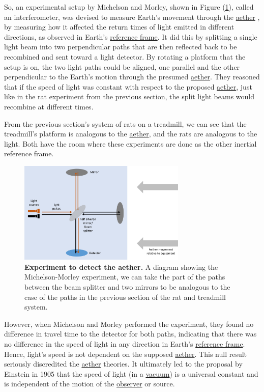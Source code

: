 So, an experimental setup by Michelson and Morley, shown in Figure (\ref{fig: Michelson_morley}), called an interferometer, was devised to measure Earth's movement through the \hyperlink{def-aether}{aether} \cite{EtherExperiment}, by measuring how it affected the return times of light emitted in different directions, as observed in Earth's \hyperlink{def-Reference-frame}{reference frame}.
It did this by splitting a single light beam into two perpendicular paths that are then reflected back to be recombined and sent toward a light detector.
By rotating a platform that the setup is on, the two light paths could be aligned, one parallel and the other perpendicular to the Earth's motion through the presumed \hyperlink{def-aether}{aether}.
They reasoned that if the speed of light was constant with respect to the proposed \hyperlink{def-aether}{aether}, just like in the rat experiment from the previous section, the split light beams would recombine at different times.

From the previous section's system of rats on a treadmill, we can see that the treadmill's platform is analogous to the \hyperlink{def-aether}{aether}, and the rats are analogous to the light.
Both have the room where these experiments are done as the other inertial reference frame.

\begin{figure}[H]
	\centering
	\includegraphics[width = 8cm]{images/pdf/Michelson_morley.pdf}
	\caption{\textbf{Experiment to detect the aether.} A diagram showing the Michelson-Morley experiment, we can take the part of the paths between the beam splitter and two mirrors to be analogous to the case of the paths in the previous section of the rat and treadmill system.}
	\label{fig: Michelson_morley}
\end{figure}

However, when Michelson and Morley performed the experiment, they found no difference in travel time to the detector for both paths, indicating that there was no difference in the speed of light in any direction in Earth's \hyperlink{def-Reference-frame}{reference frame}.
Hence, light's speed is not dependent on the supposed \hyperlink{def-aether}{aether}.
This null result seriously discredited the \hyperlink{def-aether}{aether} theories.
It ultimately led to the proposal by Einstein in 1905 that the speed of light (in a \hyperlink{def-vacuum}{vacuum}) is a universal constant and is independent of the motion of the \hyperlink{def-observer}{observer} or source.

